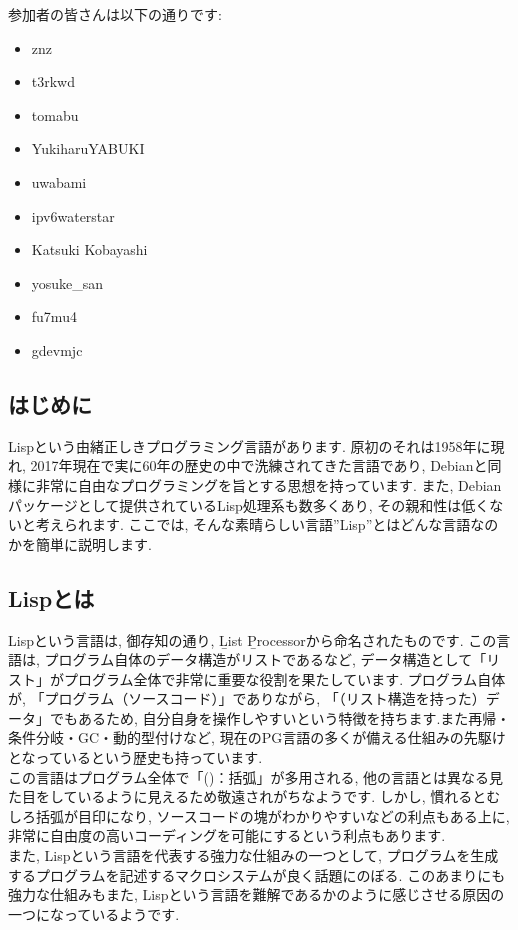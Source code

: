\documentclass[mingoth,a4paper]{jsarticle}
\begin{document}
参加者の皆さんは以下の通りです:

\begin{itemize}
\item znz
\item t3rkwd
\item tomabu
\item YukiharuYABUKI
\item uwabami
\item ipv6waterstar
\item Katsuki Kobayashi
\item yosuke\_san
\item fu7mu4
\item gdevmjc 
\end{itemize}



\subsection{はじめに}

Lispという由緒正しきプログラミング言語があります.
原初のそれは1958年に現れ, 2017年現在で実に60年の歴史の中で洗練されてきた言語であり, Debianと同様に非常に自由なプログラミングを旨とする思想を持っています.
また, Debianパッケージとして提供されているLisp処理系も数多くあり, その親和性は低くないと考えられます. ここでは, そんな素晴らしい言語”Lisp”とはどんな言語なのかを簡単に説明します.

\subsection{Lispとは}

Lispという言語は, 御存知の通り, \b{Lis}t \b{P}rocessorから命名されたものです. この言語は, プログラム自体のデータ構造がリストであるなど, データ構造として「リスト」がプログラム全体で非常に重要な役割を果たしています. プログラム自体が, 「プログラム（ソースコード）」でありながら, 「（リスト構造を持った）データ」でもあるため, 自分自身を操作しやすいという特徴を持ちます.また再帰・条件分岐・GC・動的型付けなど, 現在のPG言語の多くが備える仕組みの先駆けとなっているという歴史も持っています. \vspace{1em}\\
この言語はプログラム全体で「()：括弧」が多用される, 他の言語とは異なる見た目をしているように見えるため敬遠されがちなようです. しかし, 慣れるとむしろ括弧が目印になり, ソースコードの塊がわかりやすいなどの利点もある上に, 非常に自由度の高いコーディングを可能にするという利点もあります. \vspace{1em}\\
また, Lispという言語を代表する強力な仕組みの一つとして, プログラムを生成するプログラムを記述するマクロシステムが良く話題にのぼる. このあまりにも強力な仕組みもまた, Lispという言語を難解であるかのように感じさせる原因の一つになっているようです. 
\end{document}
